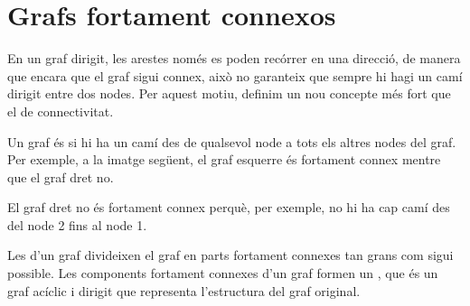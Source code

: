 \chapter{Grafs fortament connexos}


En un graf dirigit, les arestes només es poden recórrer en una
direcció, de manera que encara que el graf sigui connex, això no
garanteix que sempre hi hagi un camí dirigit entre dos nodes. Per aquest
motiu, definim un nou concepte més fort que el de connectivitat.

Un graf és  si hi ha un camí des de qualsevol
node a tots els altres nodes del graf. Per exemple, a la imatge
següent, el graf esquerre és fortament connex mentre que el graf dret
no.


\begin{center}
\end{center}


El graf dret no és fortament connex perquè, per exemple, no hi ha cap
camí des del node 2 fins al node 1.

 

Les  d'un graf divideixen el graf
en parts fortament connexes tan grans com sigui possible. Les
components fortament connexes d'un graf formen un , que és un graf acíclic i dirigit que representa
l'estructura del graf original.

